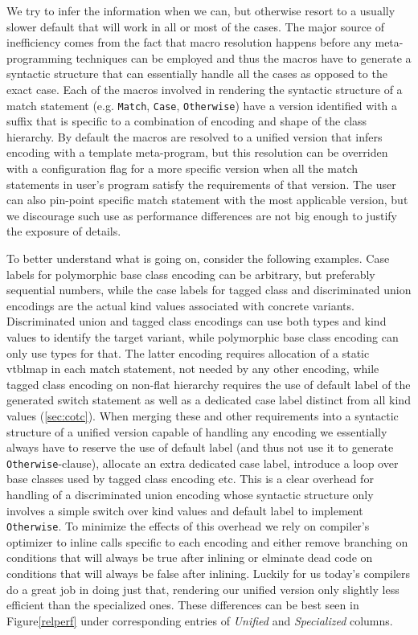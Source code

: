 \documentclass[preprint]{sigplanconf}
\makeatletter
\DeclareRobustCommand{\code}[1]{{\lstinline[breaklines=false,escapechar=@]{#1}}}
\makeatother
\begin{document}
We try to infer the information when we can, but otherwise resort to a usually 
slower default that will work in all or most of the cases. The major source of 
inefficiency comes from the fact that macro resolution happens before any 
meta-programming techniques can be employed and thus the macros have to generate 
a syntactic structure that can essentially handle all the cases as opposed to 
the exact case. Each of the macros involved in rendering the syntactic structure 
of a match statement (e.g. \code{Match}, \code{Case}, \code{Otherwise}) have a 
version identified with a suffix that is specific to a combination of encoding 
and shape of the class hierarchy. By default the macros are resolved to a 
unified version that infers encoding with a template meta-program, but this 
resolution can be overriden with a configuration flag for a more specific 
version when all the match statements in user's program satisfy the requirements 
of that version. The user can also pin-point specific match statement with the 
most applicable version, but we discourage such use as performance differences 
are not big enough to justify the exposure of details.

To better understand what is going on, consider the following examples. Case 
labels for polymorphic base class encoding can be arbitrary, but preferably 
sequential numbers, while the case labels for tagged class and discriminated 
union encodings are the actual kind values associated with concrete variants.
Discriminated union and tagged class encodings can use both types and kind values to identify the target variant, while polymorphic 
base class encoding can only use types for that. The latter encoding requires 
allocation of a static vtblmap in each match statement, not needed by any other 
encoding, while tagged class encoding on non-flat hierarchy requires the use of 
default label of the generated switch statement as well as a dedicated case 
label distinct from all kind values (\textsection\ref{sec:cotc}). 
When merging these and other requirements into a syntactic structure of a 
unified version capable of handling any encoding we essentially always have to 
reserve the use of default label (and thus not use it to generate 
\code{Otherwise}-clause), allocate an extra dedicated case label, introduce  
a loop over base classes used by tagged class encoding etc. This is a clear 
overhead for handling of a discriminated union encoding whose syntactic 
structure only involves a simple switch over kind values and default label to 
implement \code{Otherwise}. To minimize the effects of this overhead we rely on 
compiler's optimizer to inline calls specific to each encoding and either remove 
branching on conditions that will always be true after inlining or elminate dead 
code on conditions that will always be false after inlining. Luckily for us 
today's compilers do a great job in doing just that, rendering our unified 
version only slightly less efficient than the specialized ones. These 
differences can be best seen in Figure\ref{relperf} under corresponding entries 
of \emph{Unified} and \emph{Specialized} columns.
\end{document}
